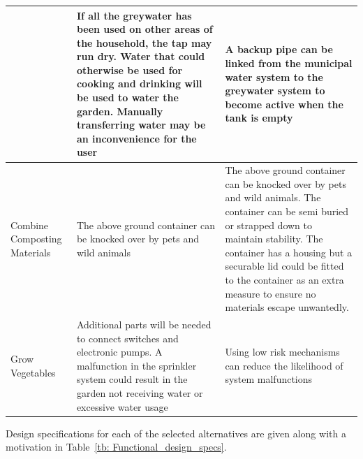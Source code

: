 \documentclass[a4paper,11pt,fleqn]{report}
\begin{document}
\begin{table}[h!]
\begin{center}
\begin{tabular}{p{3cm}|p{5.5cm}|p{5.5cm}}
{    \hline
Reuse Water & If all the greywater has been used on other areas of the household, the tap may run dry. Water that could otherwise be used for cooking and drinking will be used to water the garden. Manually transferring water may be an inconvenience for the user & A backup pipe can be linked from the municipal water system to the greywater system to become active when the tank is empty\\
    \hline
Combine Composting Materials & The above ground container can be knocked over by pets and wild animals & 
The above ground container can be knocked over by pets and wild animals. The container can be semi buried or strapped down to maintain stability. The container has a housing but a securable lid could be fitted to the container as an extra measure to ensure no materials escape unwantedly. \\
    \hline
Grow Vegetables & Additional parts will be needed to connect switches and electronic pumps. A malfunction in the sprinkler system could result in the garden not receiving water or excessive water usage & 
Using low risk mechanisms can reduce the likelihood of system malfunctions\\
    \bottomrule
\end{tabular}
\end{center}
\end{table}
%
Design specifications for each of the selected alternatives are given along with a motivation in Table~\ref{tb: Functional_design_specs}.
%
\end{document}

